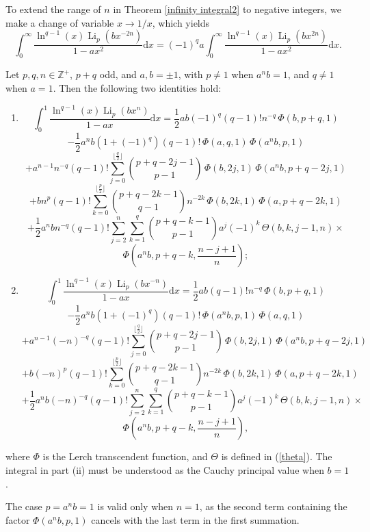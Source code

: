 \documentclass[11pt,reqno]{article}
\begin{document}
To extend the range of $n$ in Theorem \ref{infinity integral2} to negative integers, we make a change of variable $x\to1/x$, which yields
\[\int_0^\infty\frac{\ln^{q-1}(x)\operatorname{Li}_p(b{x}^{-2n})}{1-ax^2}\mathrm{d} x={(-1)}^{q}a\int_0^\infty\frac{\ln^{q-1}(x)\operatorname{Li}_p(b{x}^{2n})}{1-ax^2}\mathrm{d} x.\]


\begin{theorem}\label{from zero to one integral1}
	Let $p,q,n\in\mathbb{Z}^{+}$, $p+q$ odd, and $a,b=\pm1$, with $p\neq1$ when $a^nb=1$, and $q\neq1$ when $a=1$. Then the following two identities hold:
	\begin{enumerate}
		\item[i)]
		\[\int_0^1\frac{\ln^{q-1}(x)\operatorname{Li}_{p}(bx^{n})}{1-ax}\mathrm{d} x=\frac12 a b{(-1)}^{q}(q-1)!n^{-q}\,\Phi(b,p+q,1)\]
		\[-\frac12a^{n}b(1+{(-1)}^{q})(q-1)!\,\Phi(a,q,1)\,\Phi(a^nb,p,1)\]
		\[+a^{n-1}n^{-q} (q-1)!\sum_{j=0}^{\lfloor\frac{q}{2}\rfloor}\binom{p+q-2j-1}{p-1}\,\Phi(b,2j,1)\,\Phi(a^nb,p+q-2j,1)\]
		\[+bn^{p}(q-1)!\sum_{k=0}^{\lfloor\frac{p}{2}\rfloor}\binom{p+q-2k-1}{q-1}n^{-2k}\,\Phi(b,2k,1)\,\Phi(a,p+q-2k,1)\]
		\[+\frac12a^{n}b n^{-q}(q-1)!\sum_{j=2}^{n}\sum_{k=1}^{q}\binom{p+q-k-1}{p-1}a^{j}{(-1)}^{k}\,\Theta(b,k,j-1,n)\times\]
		\[\Phi\left(a^nb,p+q-k,\frac{n-j+1}{n}\right);\]
		\item[ii)]
		\[\int_0^1\frac{\ln^{q-1}(x)\operatorname{Li}_{p}(bx^{-n})}{1-ax}\mathrm{d} x=\frac12 ab(q-1)!n^{-q}\,\Phi(b,p+q,1)\]
		\[-\frac12a^{n}b(1+{(-1)}^{q})(q-1)!\,\Phi(a^nb,p,1)\,\Phi(a,q,1)\]
		\[+a^{n-1}{(-n)}^{-q}(q-1)!\sum_{j=0}^{\lfloor\frac{q}{2}\rfloor}\binom{p+q-2j-1}{p-1}\,\Phi(b,2j,1)\,\Phi(a^nb,p+q-2j,1)\]
		\[+b{(-n)}^{p}(q-1)!\sum_{k=0}^{\lfloor\frac{p}{2}\rfloor}\binom{p+q-2k-1}{q-1}n^{-2k}\,\Phi(b,2k,1)\,\Phi(a,p+q-2k,1)\]
		\[+\frac12 a^{n}b {(-n)}^{-q}(q-1)!\sum_{j=2}^{n}\sum_{k=1}^{q}\binom{p+q-k-1}{p-1}a^{j}{(-1)}^{k}\,\Theta(b,k,j-1,n)\times\]
		\[\Phi\left(a^nb,p+q-k,\frac{n-j+1}{n}\right),\]
	\end{enumerate}		
	where $\Phi$ is the Lerch transcendent function, and $\Theta$ is defined in (\ref{theta}). The integral in part (ii) must be understood as the Cauchy principal value when $b=1$. 
\end{theorem}
\begin{remark}
	The case $p=a^nb=1$ is valid only when $n=1$, as the second term containing the factor $\Phi(a^nb,p,1)$ cancels with the last term in the first summation.
\end{remark}
\end{document}
